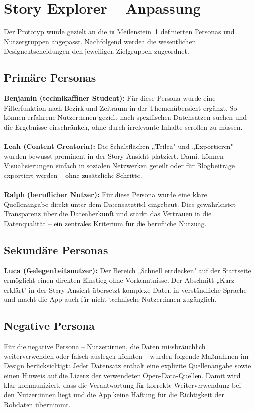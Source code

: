 \section{Story Explorer – Anpassung}
%
\noindent
Der Prototyp wurde gezielt an die in Meilenstein~1 definierten
Personas und Nutzergruppen angepasst. Nachfolgend werden die
wesentlichen Designentscheidungen den jeweiligen Zielgruppen zugeordnet.
%
\subsection{Primäre Personas}
%
\noindent
\textbf{Benjamin (technikaffiner Student):}
Für diese Persona wurde eine Filterfunktion nach Bezirk und
Zeitraum in der Themenübersicht ergänzt. So können erfahrene
Nutzer:innen gezielt nach spezifischen Datensätzen suchen und
die Ergebnisse einschränken, ohne durch irrelevante Inhalte
scrollen zu müssen.
\\
\\
\textbf{Leah (Content Creatorin):}
Die Schaltflächen „Teilen" und „Exportieren" wurden bewusst
prominent in der Story-Ansicht platziert. Damit können
Visualisierungen einfach in sozialen Netzwerken geteilt oder
für Blogbeiträge exportiert werden – ohne zusätzliche Schritte.
\\
\\
\textbf{Ralph (beruflicher Nutzer):}
Für diese Persona wurde eine klare Quellenangabe direkt unter
dem Datensatztitel eingebaut. Dies gewährleistet Transparenz
über die Datenherkunft und stärkt das Vertrauen in die
Datenqualität – ein zentrales Kriterium für die berufliche Nutzung.
%
\subsection{Sekundäre Personas}
%
\noindent
\textbf{Luca (Gelegenheitsnutzer):}
Der Bereich „Schnell entdecken" auf der Startseite ermöglicht
einen direkten Einstieg ohne Vorkenntnisse. Der Abschnitt
„Kurz erklärt" in der Story-Ansicht übersetzt komplexe Daten
in verständliche Sprache und macht die App auch für
nicht-technische Nutzer:innen zugänglich.
%
\subsection{Negative Persona}
%
\noindent
Für die negative Persona – Nutzer:innen, die Daten missbräuchlich
weiterverwenden oder falsch auslegen könnten – wurden folgende
Maßnahmen im Design berücksichtigt: Jeder Datensatz enthält eine
explizite Quellenangabe sowie einen Hinweis auf die Lizenz der
verwendeten Open-Data-Quellen. Damit wird klar kommuniziert,
dass die Verantwortung für korrekte Weiterverwendung bei den
Nutzer:innen liegt und die App keine Haftung für die Richtigkeit
der Rohdaten übernimmt.
